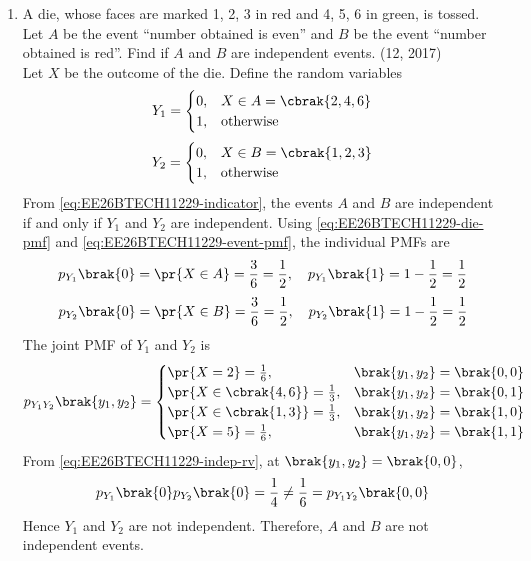 \begin{enumerate}[label=\thesubsection.\arabic*, ref=\thesubsection.\theenumi]
The following code verifies the solution
\begin{lstlisting}[frame=single, basicstyle=\rmfamily, escapeinside={(*@}{@*)}]
(*@\makebox[\dimexpr\linewidth-2\fboxsep-2\fboxrule\relax][c]{codes/determinant.py}@*)
\end{lstlisting}
\item 
A die, whose faces are marked 1, 2, 3 in red and 4, 5, 6 in green, is tossed. Let $A$ be the event ``number obtained is even'' and $B$ be the event ``number obtained is red''. Find if $A$ and $B$ are independent events.
\hfill (12, 2017)
\\
\solution
Let $X$ be the outcome of the die. Define the random variables
\begin{align}
	Y_1 = \begin{cases}
		0, & X \in A = \cbrak{2, 4, 6}
		\\
		1, & \text{otherwise}
	\end{cases}
\end{align}
\begin{align}
	Y_2 = \begin{cases}
		0, & X \in B = \cbrak{1, 2, 3}
		\\
		1, & \text{otherwise}
	\end{cases}
\end{align}
From \eqref{eq:EE26BTECH11229-indicator}, the events $A$ and $B$ are independent if and only if $Y_1$ and $Y_2$ are independent. Using \eqref{eq:EE26BTECH11229-die-pmf} and \eqref{eq:EE26BTECH11229-event-pmf}, the individual PMFs are
\begin{align}
	p_{Y_1}\brak{0} = \pr{X \in A} = \frac{3}{6} = \frac{1}{2}, \quad p_{Y_1}\brak{1} = 1 - \frac{1}{2} = \frac{1}{2}
\end{align}
\begin{align}
	p_{Y_2}\brak{0} = \pr{X \in B} = \frac{3}{6} = \frac{1}{2}, \quad p_{Y_2}\brak{1} = 1 - \frac{1}{2} = \frac{1}{2}
\end{align}
The joint PMF of $Y_1$ and $Y_2$ is
\begin{align}
	p_{Y_1Y_2}\brak{y_1, y_2} = \begin{cases}
		\pr{X = 2} = \frac{1}{6}, & \brak{y_1, y_2} = \brak{0, 0}
		\\
		\pr{X \in \cbrak{4, 6}} = \frac{1}{3}, & \brak{y_1, y_2} = \brak{0, 1}
		\\
		\pr{X \in \cbrak{1, 3}} = \frac{1}{3}, & \brak{y_1, y_2} = \brak{1, 0}
		\\
		\pr{X = 5} = \frac{1}{6}, & \brak{y_1, y_2} = \brak{1, 1}
	\end{cases}
\end{align}
From \eqref{eq:EE26BTECH11229-indep-rv}, at $\brak{y_1, y_2} = \brak{0, 0}$,
\begin{align}
	p_{Y_1}\brak{0}p_{Y_2}\brak{0} = \frac{1}{4} \neq \frac{1}{6} = p_{Y_1Y_2}\brak{0, 0}
\end{align}
Hence $Y_1$ and $Y_2$ are not independent. Therefore, $A$ and $B$ are not independent events.


\end{enumerate}
